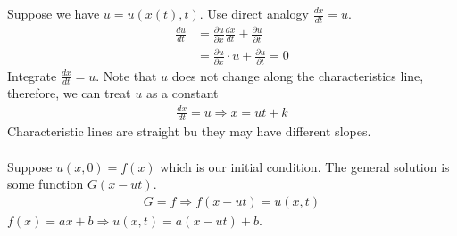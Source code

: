 \documentclass[12pt, letterpaper]{article}
\begin{document}
Suppose we have $u = u(x(t),t)$. Use direct analogy $\frac{dx}{dt} = u$.
\begin{align*}
    \frac{du}{dt} &= \frac{\partial u }{\partial x} \frac{dx}{dt} + \frac{\partial u}{\partial t} \\
    &= \frac{\partial u}{\partial x} \cdot u + \frac{\partial u}{\partial t} = 0
\end{align*}
Integrate $\frac{dx}{dt} = u$. Note that $u$ does not change along the characteristics line,
therefore, we can treat $u$ as a constant
\begin{align*}
    \frac{dx}{dt} = u  \Rightarrow x = ut + k
\end{align*}
Characteristic lines are straight bu they may have different slopes. \\ \\
Suppose $u(x,0) = f(x)$ which is our initial condition. The general solution is some function 
$G(x-ut)$.
\begin{align*}
    G = f \Rightarrow f(x-ut) = u(x,t)
\end{align*}
 $f(x) = ax+b \Rightarrow u(x,t) = a(x-ut) + b$.
\end{document}
